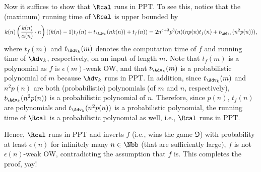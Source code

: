 \begin{answer}[ii]
    Now it suffices to show that $\Rcal$ runs in PPT. To see this, notice that the (maximum) running time of $\Rcal$ is upper bounded by
    \[
        k(n)\left(\frac{k(n)}{\alpha(n)}\cdot n\right) ((k(n)-1) t_f(n) +t_{\Adv_k}(nk(n))+t_f(n)) 
        = 2n^{c+3}p^3(n) (np(n)t_f(n)+t_{\Adv_k}(n^2p(n))),
    \]
    where $t_f(m)$ and $t_{\Adv_k}(m)$ denotes the computation time of $f$ and running time of $\Adv_k$, respectively, on an input of length $m$. Note that $t_f(m)$ is a polynomial as $f$ is $\epsilon(m)$-weak OW, and that $t_{\Adv_k}(m)$ is a probabilistic polynomial of $m$ because $\Adv_k$ runs in PPT. In addition, since $t_{\Adv_k}(m)$ and $n^2p(n)$ are both (probabilistic) polynomials (of $m$ and $n$, respectively), $t_{\Adv_k}(n^2p(n))$ is a probabilistic polynomial of $n$. 
    Therefore, since $p(n)$, $t_f(n)$  are polynomials and $t_{\Adv_k}(n^2p(n))$ is a probabilistic polynomial, the running time of $\Rcal$ is a probabilistic polynomial as well, i.e.,  $\Rcal$ runs in PPT.

    Hence, $\Rcal$ runs in PPT and inverts $f$ (i.e., wins the game $\Game$) with probability at least $\epsilon(n)$ for infinitely many $n\in\Nbb$ (that are sufficiently large), $f$ is not $\epsilon(n)$-weak OW, contradicting the assumption that $f$ is. This completes the proof, yay!
\end{answer}
















